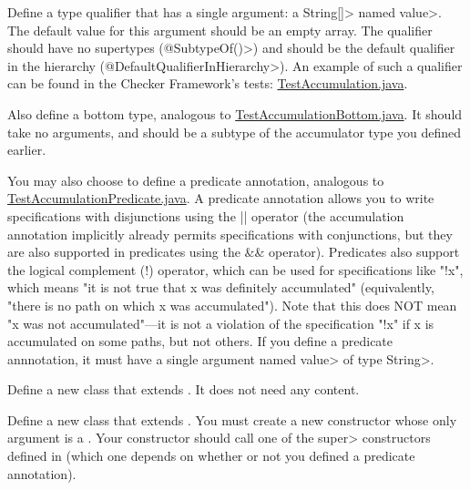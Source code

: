 Define a type qualifier that has a single argument: a \<String[]> named \<value>.
The default value for this argument should be an empty array. The
qualifier should have no supertypes (\<@SubtypeOf({})>) and should
be the default qualifier in the hierarchy (\<@DefaultQualifierInHierarchy>).
An example of such a qualifier can be found in the Checker Framework's tests:
\href{https://github.com/typetools/checker-framework/blob/master/framework/src/test/java/testaccumulation/qual/TestAccumulation.java}{TestAccumulation.java}.

Also define a bottom type, analogous to
\href{https://github.com/typetools/checker-framework/blob/master/framework/src/test/java/testaccumulation/qual/TestAccumulationBottom.java}{TestAccumulationBottom.java}.
It should take no arguments, and should be a subtype of the accumulator type you defined earlier.

You may also choose to define a predicate annotation, analogous to
\href{https://github.com/typetools/checker-framework/blob/master/framework/src/test/java/testaccumulation/qual/TestAccumulationPredicate.java}{TestAccumulationPredicate.java}.
A predicate annotation allows you to write specifications with disjunctions using the || operator (the accumulation annotation
implicitly already permits specifications with conjunctions, but they are also supported in predicates using the && operator).
Predicates also support the logical complement (!) operator, which can be used for specifications like "!x", which means
"it is not true that x was definitely accumulated" (equivalently, "there is no path on which x was accumulated").
Note that this does NOT mean "x was not accumulated"---it is not a violation of the specification "!x" if x is accumulated
on some paths, but not others.
If you define a predicate annnotation, it must have a single argument named \<value> of type \<String>.


Define a new class that extends .
It does not need any content.

Define a new class that extends .
You must create a new constructor whose only argument is a .
Your constructor should call one of the \<super> constructors defined in
 (which one depends on whether or not
you defined a predicate annotation).



